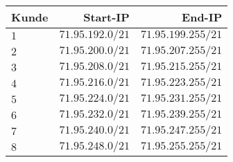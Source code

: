\begin{tabular}{|l|r|r|}\hline
Kunde & Start-IP & End-IP \\\hline\hline
$1$ & $71.95.192.0/21$ & $71.95.199.255/21$ \\\hline
$2$ & $71.95.200.0/21$ & $71.95.207.255/21$ \\\hline
$3$ & $71.95.208.0/21$ & $71.95.215.255/21$ \\\hline
$4$ & $71.95.216.0/21$ & $71.95.223.255/21$ \\\hline
$5$ & $71.95.224.0/21$ & $71.95.231.255/21$ \\\hline\hline
$6$ & $71.95.232.0/21$ & $71.95.239.255/21$ \\\hline
$7$ & $71.95.240.0/21$ & $71.95.247.255/21$ \\\hline
$8$ & $71.95.248.0/21$ & $71.95.255.255/21$ \\\hline
\end{tabular}